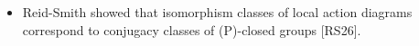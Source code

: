 \documentclass[preview]{standalone}
\begin{document}
\begin{center}
\begin{itemize} \item Reid-Smith showed that isomorphism classes of local action diagrams correspond to conjugacy classes of (P)-closed groups [RS26].\end{itemize}
\end{center}
\end{document}
